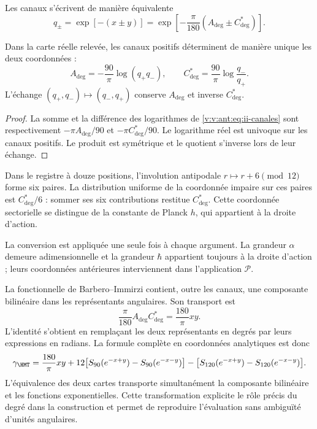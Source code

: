 Les canaux s'écrivent de manière équivalente
\begin{equation}
 q_\pm=\exp[-(x\pm y)]
 =\exp\!\left[-\frac{\pi}{180}(A_{\deg}\pm C^*_{\deg})\right].
\label{v:v:ant:eq:ii-canales}
\end{equation}
\begin{proposition}
\label{v:v:ant:prop:ii-inversion-canales-angulares}
Dans la carte réelle relevée, les canaux positifs déterminent
de manière unique les deux coordonnées :
\[
 A_{\deg}=-\frac{90}{\pi}\log(q_+q_-),\qquad
 C^*_{\deg}=\frac{90}{\pi}\log\frac{q_-}{q_+}.
\]
L'échange \((q_+,q_-)\mapsto(q_-,q_+)\) conserve
\(A_{\deg}\) et inverse \(C^*_{\deg}\).
\end{proposition}
\begin{proof}
La somme et la différence des logarithmes de
\eqref{v:v:ant:eq:ii-canales} sont respectivement
\(-\pi A_{\deg}/90\) et \(-\pi C^*_{\deg}/90\).
Le logarithme réel est univoque sur les canaux positifs.
Le produit est symétrique et le quotient s'inverse lors de leur échange.
\end{proof}
Dans le registre à douze positions, l'involution antipodale
\(r\mapsto r+6\pmod {12}\) forme six paires. La distribution
uniforme de la coordonnée impaire sur ces paires est
\(C^*_{\deg}/6\) : sommer ses six contributions restitue
\(C^*_{\deg}\). Cette coordonnée sectorielle se distingue de
la constante de Planck \(h\), qui appartient à la droite d'action.

La conversion est appliquée une seule fois à chaque argument. La grandeur
\(\alpha\) demeure adimensionnelle et la grandeur \(\hbar\)
appartient toujours à la droite d'action ; leurs coordonnées antérieures
interviennent dans l'application \(\mathcal P\).

La fonctionnelle de Barbero--Immirzi contient, outre les canaux, une
composante bilinéaire dans les représentants angulaires. Son transport est
\begin{equation}
 \frac{\pi}{180}A_{\deg}C^*_{\deg}
 =\frac{180}{\pi}xy.
 \label{v:v:ant:eq:ii-barbero-cartas}
\end{equation}
L'identité s'obtient en remplaçant les deux représentants en degrés
par leurs expressions en radians. La formule complète en
coordonnées analytiques est donc
\[
 \gamma_{\HMT}
 =\frac{180}{\pi}xy
 +12\bigl[S_{90}(e^{-x+y})-S_{90}(e^{-x-y})\bigr]
 -\bigl[S_{120}(e^{-x+y})-S_{120}(e^{-x-y})\bigr].
\]
L'équivalence des deux cartes transporte simultanément la composante bilinéaire
et les fonctions exponentielles. Cette transformation
explicite le rôle précis du degré dans la construction et permet de
reproduire l'évaluation sans ambiguïté d'unités angulaires.
